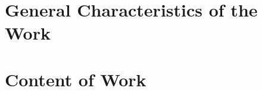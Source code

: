 \section*{General Characteristics of the Work}

\newcommand{\actuality}{\pdfbookmark[1]{PhD Dissertation Relevance}{actuality}\textbf{\actualityTXTEng}}
\newcommand{\aim}{\pdfbookmark[1]{PhD Dissertation Aim}{aim}{\textbf\aimTXTEng}}
\newcommand{\tasks}{\pdfbookmark[1]{Tasks}{tasks}\textbf{\tasksTXTEng}}
\newcommand{\aimtasks}{\pdfbookmark[1]{Цели и задачи}{aimtasks}\aimtasksTXTEng}
\newcommand{\novelty}{\pdfbookmark[1]{Novelty}{novelty}\textbf{\noveltyTXTEng}}
\newcommand{\influence}{\pdfbookmark[1]{Theoretical and Practical Value}{influence}\textbf{\influenceTXTEng}}
\newcommand{\methods}{\pdfbookmark[1]{Methodology and Research Methods}{methods}\textbf{\methodsTXTEng}}
\newcommand{\defpositions}{\pdfbookmark[1]{Key aspects that are submitted for defence}{defpositions}\textbf{\defpositionsTXTEng}}
\newcommand{\reliability}{\pdfbookmark[1]{Reliability}{reliability}\textbf{\reliabilityTXTEng}}
\newcommand{\probation}{\pdfbookmark[1]{Aprobation of the work}{probation}\textbf{\probationTXTEng}}
\newcommand{\contribution}{\pdfbookmark[1]{Personal Contribution}{contribution}\textbf{\contributionTXTEng}}
\newcommand{\publications}{\pdfbookmark[1]{Publications}{publications}\textbf{\publicationsTXTEng}}




\section*{Content of Work}


